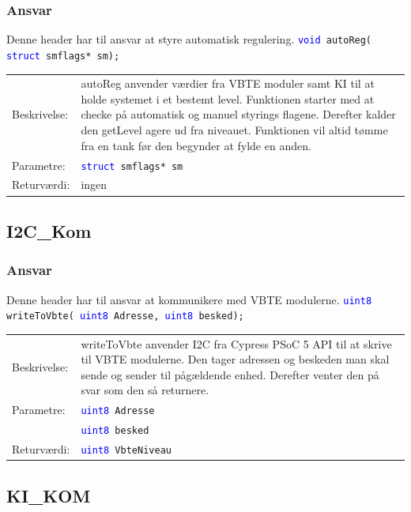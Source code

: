 \subsubsection{Ansvar}
Denne header har til ansvar at styre automatisk regulering.
\texttt{\textcolor{blue}{void} autoReg( \textcolor{blue}{struct} smflags* sm);} 
\begin{table}[H]
\begin{tabular}{l p{12.5cm}}
\hline
Beskrivelse:& autoReg anvender værdier fra VBTE moduler samt KI til at holde systemet i et bestemt level. Funktionen starter med at checke på automatisk og manuel styrings flagene. Derefter kalder den getLevel agere ud fra niveauet. Funktionen vil altid tømme fra en tank før den begynder at fylde en anden.\\
Parametre:&\texttt{\textcolor{blue}{struct} smflags* sm}\\
Returværdi:&ingen\\
\end{tabular}
\end{table}
\subsection{I2C\_Kom}
\subsubsection{Ansvar}
Denne header har til ansvar at kommunikere med VBTE modulerne.
\texttt{\textcolor{blue}{uint8} writeToVbte( \textcolor{blue}{uint8} Adresse, \textcolor{blue}{uint8} besked);} 
\begin{table}[H]
\begin{tabular}{l p{12.5cm}}
\hline
Beskrivelse:& writeToVbte anvender I2C fra Cypress PSoC 5 API til at skrive til VBTE modulerne. Den tager adressen og beskeden man skal sende og sender til pågældende enhed. Derefter venter den på svar som den så returnere. \\
Parametre:&\texttt{\textcolor{blue}{uint8} Adresse}\\
 &\texttt{\textcolor{blue}{uint8} besked}\\
Returværdi:&\texttt{\textcolor{blue}{uint8} VbteNiveau}\\
\end{tabular}
\end{table}
\subsection{KI\_KOM}
